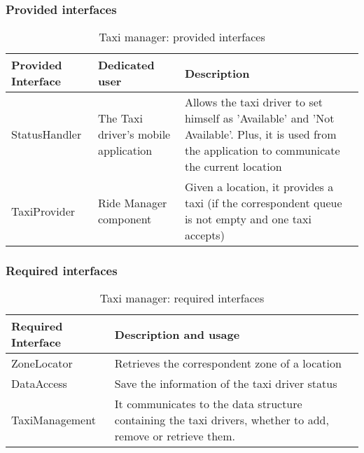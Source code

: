 \subsubsection{Provided interfaces}
\begin{table}[H]
	\begin{longtable}{| p{} | p{} | p{} |}
		\hline
		\textbf{Provided Interface} & \textbf{Dedicated user} & \textbf{Description} \\ \hline
		StatusHandler & The Taxi driver's mobile application & Allows the taxi driver to set himself as 'Available' and 'Not Available'. Plus, it is used from the application to communicate the current location \\ \hline
		TaxiProvider & Ride Manager component & Given a location, it provides a taxi (if the correspondent queue is not empty and one taxi accepts) \\ \hline
	\end{longtable}
	\caption{Taxi manager: provided interfaces}
	\label{tab:taximanager:providedInterfaces}
\end{table}
\subsubsection{Required interfaces}
\begin{table}[H]
	\begin{longtable}{| l | p{} |}
		\hline
		\textbf{Required Interface} & \textbf{Description and usage} \\ \hline
		ZoneLocator & Retrieves the correspondent zone of a location \\ \hline
		DataAccess & Save the information of the taxi driver status \\ \hline
		TaxiManagement & It communicates to the data structure containing the taxi drivers, whether to add, remove or retrieve them. \\ \hline
	\end{longtable}
	\caption{Taxi manager: required interfaces}
	\label{tab:taximanager:requiredInterfaces}
\end{table}
